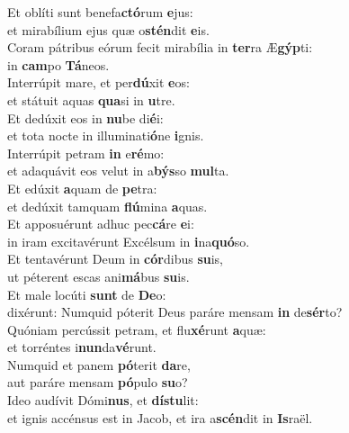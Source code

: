 \evenverse Et oblíti sunt benefa\textbf{ctó}rum \textbf{e}jus:~\*\\
\evenverse et mirabílium ejus quæ o\textbf{stén}dit \textbf{e}is.\\
\oddverse Coram pátribus eórum fecit mirabília in \textbf{ter}ra Æ\textbf{gýp}ti:~\*\\
\oddverse in \textbf{cam}po \textbf{Tá}neos.\\
\evenverse Interrúpit mare, et per\textbf{dú}xit \textbf{e}os:~\*\\
\evenverse et státuit aquas \textbf{qua}si in \textbf{u}tre.\\
\oddverse Et dedúxit eos in \textbf{nu}be di\textbf{é}i:~\*\\
\oddverse et tota nocte in illuminati\textbf{ó}ne \textbf{i}gnis.\\
\evenverse Interrúpit petram \textbf{in} e\textbf{ré}mo:~\*\\
\evenverse et adaquávit eos velut in a\textbf{býs}so \textbf{mul}ta.\\
\oddverse Et edúxit \textbf{a}quam de \textbf{pe}tra:~\*\\
\oddverse et dedúxit tamquam \textbf{flú}mina \textbf{a}quas.\\
\evenverse Et apposuérunt adhuc pec\textbf{cá}re \textbf{e}i:~\*\\
\evenverse in iram excitavérunt Excélsum in \textbf{i}na\textbf{quó}so.\\
\oddverse Et tentavérunt Deum in \textbf{cór}dibus \textbf{su}is,~\*\\
\oddverse ut péterent escas ani\textbf{má}bus \textbf{su}is.\\
\evenverse Et male locúti \textbf{sunt} de \textbf{De}o:~\*\\
\evenverse dixérunt: Numquid póterit Deus paráre mensam \textbf{in} de\textbf{sér}to?\\
\oddverse Quóniam percússit petram, et flu\textbf{xé}runt \textbf{a}quæ:~\*\\
\oddverse et torréntes i\textbf{nun}da\textbf{vé}runt.\\
\evenverse Numquid et panem \textbf{pó}terit \textbf{da}re,~\*\\
\evenverse aut paráre mensam \textbf{pó}pulo \textbf{su}o?\\
\oddverse Ideo audívit Dómi\textbf{nus}, et \textbf{dí}\textbf{stu}lit:~\*\\
\oddverse et ignis accénsus est in Jacob, et ira a\textbf{scén}dit in \textbf{Is}raël.\\
